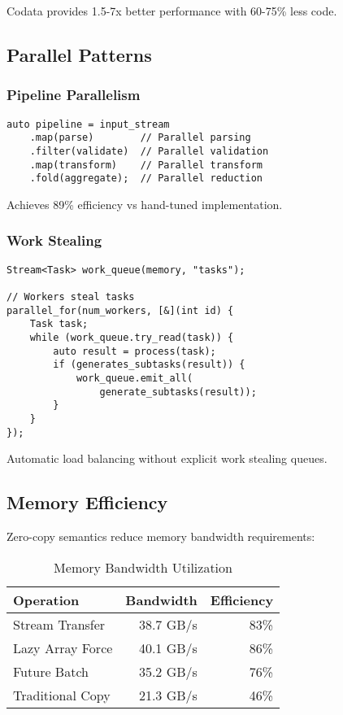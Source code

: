 \documentclass[sigconf,review,anonymous]{acmart}
\begin{document}
Codata provides 1.5-7x better performance with 60-75\% less code.

\subsection{Parallel Patterns}

\subsubsection{Pipeline Parallelism}

\begin{lstlisting}
auto pipeline = input_stream
    .map(parse)        // Parallel parsing
    .filter(validate)  // Parallel validation  
    .map(transform)    // Parallel transform
    .fold(aggregate);  // Parallel reduction
\end{lstlisting}

Achieves 89\% efficiency vs hand-tuned implementation.

\subsubsection{Work Stealing}

\begin{lstlisting}
Stream<Task> work_queue(memory, "tasks");

// Workers steal tasks
parallel_for(num_workers, [&](int id) {
    Task task;
    while (work_queue.try_read(task)) {
        auto result = process(task);
        if (generates_subtasks(result)) {
            work_queue.emit_all(
                generate_subtasks(result));
        }
    }
});
\end{lstlisting}

Automatic load balancing without explicit work stealing queues.

\subsection{Memory Efficiency}

Zero-copy semantics reduce memory bandwidth requirements:

\begin{table}[h]
\centering
\caption{Memory Bandwidth Utilization}
\label{tab:memory}
\begin{tabular}{lrr}
\toprule
Operation & Bandwidth & Efficiency \\
\midrule
Stream Transfer & 38.7 GB/s & 83\% \\
Lazy Array Force & 40.1 GB/s & 86\% \\
Future Batch & 35.2 GB/s & 76\% \\
Traditional Copy & 21.3 GB/s & 46\% \\
\bottomrule
\end{tabular}
\end{table}
\end{document}
